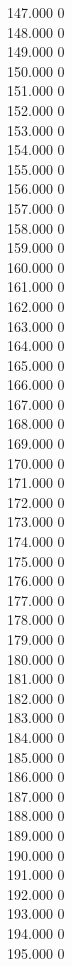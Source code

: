 { 147.000	0 \\
 148.000	0 \\
 149.000	0 \\
 150.000	0 \\
 151.000	0 \\
 152.000	0 \\
 153.000	0 \\
 154.000	0 \\
 155.000	0 \\
 156.000	0 \\
 157.000	0 \\
 158.000	0 \\
 159.000	0 \\
 160.000	0 \\
 161.000	0 \\
 162.000	0 \\
 163.000	0 \\
 164.000	0 \\
 165.000	0 \\
 166.000	0 \\
 167.000	0 \\
 168.000	0 \\
 169.000	0 \\
 170.000	0 \\
 171.000	0 \\
 172.000	0 \\
 173.000	0 \\
 174.000	0 \\
 175.000	0 \\
 176.000	0 \\
 177.000	0 \\
 178.000	0 \\
 179.000	0 \\
 180.000	0 \\
 181.000	0 \\
 182.000	0 \\
 183.000	0 \\
 184.000	0 \\
 185.000	0 \\
 186.000	0 \\
 187.000	0 \\
 188.000	0 \\
 189.000	0 \\
 190.000	0 \\
 191.000	0 \\
 192.000	0 \\
 193.000	0 \\
 194.000	0 \\
 195.000	0 \\
}

